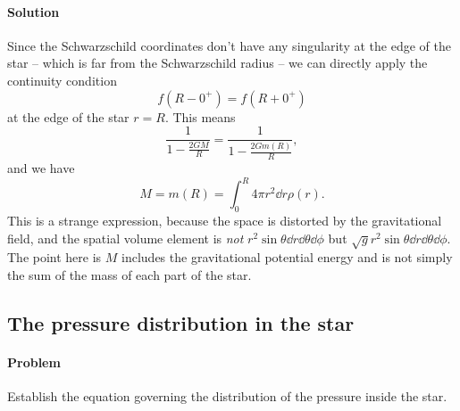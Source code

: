 \documentclass[hyperref, a4paper]{article}
\begin{document}
\paragraph{Solution} Since the Schwarzschild coordinates don't have any singularity at the edge of the star 
-- which is far from the Schwarzschild radius -- we can directly apply the continuity condition 
\[
    f(R - 0^+) = f(R + 0^+)
\]
at the edge of the star $r = R$. This means 
\[
    \frac{1}{1 - \frac{2GM}{R}} = \frac{1}{1 - \frac{2 G m(R)}{R}},
\]
and we have 
\begin{equation}
    M = m(R) = \int_0^R 4 \pi r^2 \dd{r} \rho(r). 
\end{equation}
This is a strange expression, because the space is distorted by the gravitational field, and the spatial volume
element is \emph{not} $r^2 \sin\theta \dd{r} \dd{\theta} \dd{\phi}$ but $\sqrt{g} r^2 \sin\theta \dd{r} \dd{\theta} \dd{\phi}$. The point here is $M$ includes the gravitational potential energy and is not simply the sum of the 
mass of each part of the star.

\subsection{The pressure distribution in the star}

\paragraph{Problem} Establish the equation governing the distribution of the pressure inside the star. 
\end{document}
